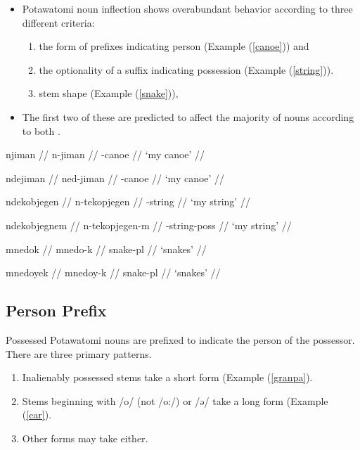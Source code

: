 \begin{itemize}
\item Potawatomi noun inflection shows overabundant behavior according
  to three different criteria:
  \begin{enumerate}
  \item the form of prefixes indicating person (Example (\ref{canoe}))
    and
  \item the optionality of a suffix indicating possession (Example
    (\ref{string})).
  \item stem shape (Example (\ref{snake})),
  \end{enumerate}
\item The first two of these are predicted to affect the majority of
  nouns according to both \citet{hockett1948potawatomi2,
    lockwood2017potawatomi}.
\end{itemize}

\pex\label{canoe}
\a\label{canoeshort}
\begingl
\gla njiman // 
\glb n-jiman //
-canoe //
\glft `my canoe' //
\endgl

\a\label{canoelong}
\begingl
\gla ndejiman //
\glb ned-jiman //
-canoe //
\glft `my canoe'  //
\endgl
\xe

\pex\label{string}
\a\label{string-}
\begingl
\gla ndekobjegen // 
\glb n-tekopjegen //
-string //
\glft `my string' //
\endgl

\a\label{string-m}
\begingl
\gla ndekobjegnem //
\glb n-tekopjegen-m //
-string-{\sc poss} //
\glft `my string'  //
\endgl
\xe

\pex\label{snake}
\a\label{snakev}
\begingl
\gla mnedok // 
\glb mnedo-k //
\glc snake-{\sc pl} //
\glft `snakes' //
\endgl

\a\label{snakey}
\begingl
\gla mnedoyek //
\glb mnedoy-k //
\glc snake-{\sc pl} //
\glft `snakes'  //
\endgl
\xe

\subsection{Person Prefix}

Possessed Potawatomi nouns are prefixed to indicate the person of the
possessor. There are three primary patterns.

\begin{enumerate}
\item Inalienably possessed stems take a short form (Example
  (\ref{granpa}).
\item Stems beginning with /o/ (not /o:/) or /ə/ take a long form
  (Example (\ref{car}).
\item Other forms may take either.
\end{enumerate}

